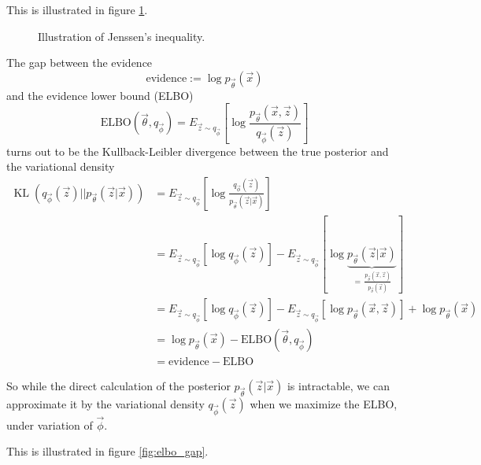 This is illustrated in figure \ref{fig:jenssen}.

\begin{figure}[H]
    \centering
    
    \caption{Illustration of Jenssen's inequality.}
    \label{fig:jenssen}
\end{figure}

The gap between the evidence
\begin{equation}
    \text{evidence} := \log p_\vec{\theta}(\vec{x})
\end{equation}
and the evidence lower bound (ELBO)
\begin{equation}
    \text{ELBO}(\vec{\theta}, q_{\vec{\phi}}) = E_{\vec{z} \sim q_{\vec{\phi}}} \left[ \log \frac{p_\vec{\theta}(\vec{x},\vec{z})}{q_{\vec{\phi}}(\vec{z})} \right]
\end{equation}
turns out to be the Kullback-Leibler divergence between the true posterior and the variational density
\begin{equation}
    \begin{aligned}
        \operatorname{KL}(q_{\vec{\phi}}(\vec{z}) || p_{\vec{\theta}}(\vec{z} | \vec{x})) &= E_{\vec{z} \sim q_{\vec{\phi}}} \left[ \log \frac{q_{\vec{\phi}}(\vec{z})}{p_{\vec{\theta}}(\vec{z} | \vec{x})} \right] \\
        &= E_{\vec{z} \sim q_{\vec{\phi}}} \left[ \log q_{\vec{\phi}}(\vec{z})\right] - E_{\vec{z} \sim q_{\vec{\phi}}} \left[ \log \underbrace{p_{\vec{\theta}}(\vec{z} | \vec{x})}_{=\, \frac{p_\vec{\theta}(\vec{x},\vec{z})}{p_\vec{\theta}(\vec{x})}} \right] \\
        &= E_{\vec{z} \sim q_{\vec{\phi}}} \left[ \log q_{\vec{\phi}}(\vec{z})\right] - E_{\vec{z} \sim q_{\vec{\phi}}} \left[ \log p_{\vec{\theta}}(\vec{x},\vec{z}) \right] + \log p_\vec{\theta}(\vec{x}) \\
        &= \log p_\vec{\theta}(\vec{x}) - \text{ELBO}(\vec{\theta}, q_{\vec{\phi}}) \\
        &= \text{evidence} - \text{ELBO}
    \end{aligned}
\end{equation}

So while the direct calculation of the posterior $p_{\vec{\theta}}(\vec{z} | \vec{x})$ is intractable, we can
approximate it by the variational density $q_{\vec{\phi}}(\vec{z})$ when we maximize the ELBO, under
variation of $\vec{\phi}$.

This is illustrated in figure \ref{fig:elbo_gap}.

